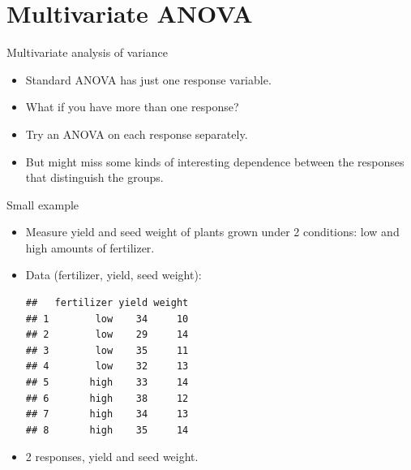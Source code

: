 \section{Multivariate ANOVA}
\frame{\sectionpage}


\begin{frame}[fragile]{Multivariate analysis of variance}

  \begin{itemize}
  \item Standard ANOVA has just one response variable.
  \item What if you have more than one response?
  \item Try an ANOVA on each response separately.
  \item But might miss some kinds of interesting dependence between the responses that distinguish the groups.
  \end{itemize}
  
\end{frame}

\begin{frame}[fragile]{Small example}

  \begin{itemize}
  \item Measure yield and seed weight of plants grown under 2 conditions: low and high amounts of fertilizer.
  \item Data (fertilizer, yield, seed weight):


 
\begin{knitrout}
\color{fgcolor}\begin{kframe}
\begin{alltt}
\hlkwb{=}\hlstd{(}\hlstd{,}
\end{alltt}
\begin{verbatim}
##   fertilizer yield weight
## 1        low    34     10
## 2        low    29     14
## 3        low    35     11
## 4        low    32     13
## 5       high    33     14
## 6       high    38     12
## 7       high    34     13
## 8       high    35     14
\end{verbatim}
\end{kframe}
\end{knitrout}

  \item 2 responses, yield and seed weight.
  \end{itemize}
  
\end{frame}

